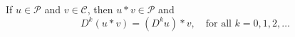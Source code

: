 If $u \in \mathcal{P}$ and $v \in \mathcal{C}$, then $u * v \in \mathcal{P}$ and
$$D^k(u * v) = (D^k u) * v, \quad \text{for all } k = 0, 1, 2, \ldots$$
